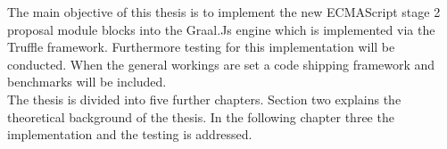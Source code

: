 The main objective of this thesis is to implement the new ECMAScript stage 2 proposal module blocks into the Graal.Js engine which is implemented via the Truffle framework. Furthermore testing for this implementation will be conducted. When the general workings are set a code shipping framework and benchmarks will be included.\\
The thesis is divided into five further chapters. Section two explains the theoretical background of the thesis. In the following chapter three the implementation and the testing is addressed. 



